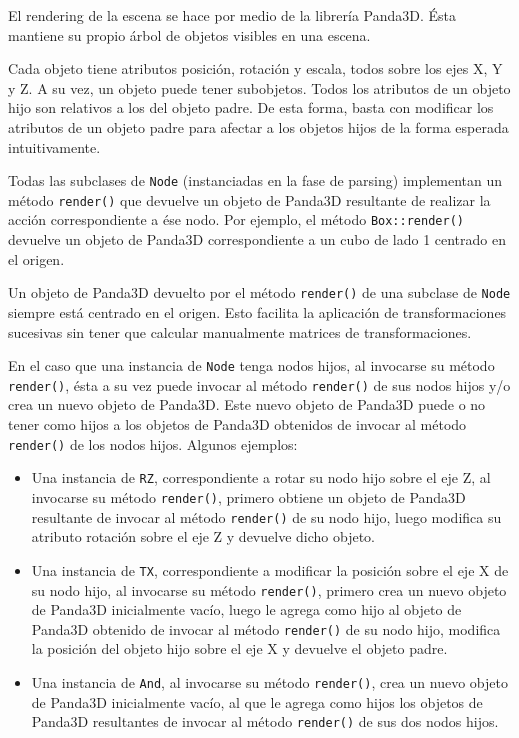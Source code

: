 \documentclass[a4paper, 10pt, twoside]{article}
\begin{document}
El rendering de la escena se hace por medio de la librería Panda3D. Ésta mantiene su propio árbol de objetos visibles en una escena.

Cada objeto tiene atributos posición, rotación y escala, todos sobre los ejes X, Y y Z. A su vez, un objeto puede tener subobjetos. Todos los atributos de un objeto hijo son relativos a los del objeto padre. De esta forma, basta con modificar los atributos de un objeto padre para afectar a los objetos hijos de la forma esperada intuitivamente.

Todas las subclases de \texttt{Node} (instanciadas en la fase de parsing) implementan un método \texttt{render()} que devuelve un objeto de Panda3D resultante de realizar la acción correspondiente a ése nodo. Por ejemplo, el método \texttt{Box::render()} devuelve un objeto de Panda3D correspondiente a un cubo de lado 1 centrado en el origen.

Un objeto de Panda3D devuelto por el método \texttt{render()} de una subclase de \texttt{Node} siempre está centrado en el origen. Esto facilita la aplicación de transformaciones sucesivas sin tener que calcular manualmente matrices de transformaciones.

En el caso que una instancia de \texttt{Node} tenga nodos hijos, al invocarse su método \texttt{render()}, ésta a su vez puede invocar al método \texttt{render()} de sus nodos hijos y/o crea un nuevo objeto de Panda3D. Este nuevo objeto de Panda3D puede o no tener como hijos a los objetos de Panda3D obtenidos de invocar al método \texttt{render()} de los nodos hijos. Algunos ejemplos:

\begin{itemize}
  \item Una instancia de \texttt{RZ}, correspondiente a rotar su nodo hijo sobre el eje Z, al invocarse su método \texttt{render()}, primero obtiene un objeto de Panda3D resultante de invocar al método \texttt{render()} de su nodo hijo, luego modifica su atributo rotación sobre el eje Z y devuelve dicho objeto.

  \item Una instancia de \texttt{TX}, correspondiente a modificar la posición sobre el eje X de su nodo hijo, al invocarse su método \texttt{render()}, primero crea un nuevo objeto de Panda3D inicialmente vacío, luego le agrega como hijo al objeto de Panda3D obtenido de invocar al método \texttt{render()} de su nodo hijo, modifica la posición del objeto hijo sobre el eje X y devuelve el objeto padre.

  \item Una instancia de \texttt{And}, al invocarse su método \texttt{render()}, crea un nuevo objeto de Panda3D inicialmente vacío, al que le agrega como hijos los objetos de Panda3D resultantes de invocar al método \texttt{render()} de sus dos nodos hijos.
\end{itemize}
\end{document}
